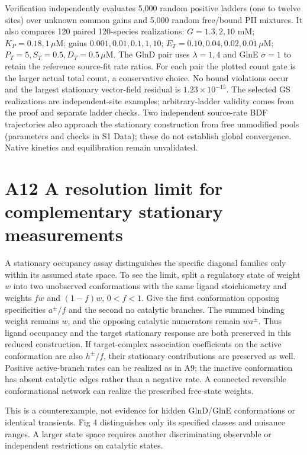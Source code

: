 \documentclass[11pt]{article}
\begin{document}
Verification independently evaluates 5,000 random positive ladders (one to twelve sites) over unknown common gains and 5,000 random free/bound PII mixtures. It also compares 120 paired 120-species realizations: $G=1.3,2,10$ mM; $K_P=0.18,1\,\mu$M; gains $0.001,0.01,0.1,1,10$; $E_T=0.10,0.04,0.02,0.01\,\mu$M; $P_T=5,S_T=0.5,D_T=0.5\,\mu$M. The GlnD pair uses $\lambda=1,4$ and GlnE $\sigma=1$ to retain the reference source-fit rate ratios. For each pair the plotted count gate is the larger actual total count, a conservative choice. No bound violations occur and the largest stationary vector-field residual is $1.23\times10^{-15}$. The selected GS realizations are independent-site examples; arbitrary-ladder validity comes from the proof and separate ladder checks. Two independent source-rate BDF trajectories also approach the stationary construction from free unmodified pools (parameters and checks in S1 Data); these do not establish global convergence. Native kinetics and equilibration remain unvalidated.

\section*{A12 A resolution limit for complementary stationary measurements}

A stationary occupancy assay distinguishes the specific diagonal families only within its assumed state space. To see the limit, split a regulatory state of weight $w$ into two unobserved conformations with the same ligand stoichiometry and weights $fw$ and $(1-f)w$, $0<f<1$. Give the first conformation opposing specificities $a^{\pm}/f$ and the second no catalytic branches. The summed binding weight remains $w$, and the opposing catalytic numerators remain $wa^{\pm}$. Thus ligand occupancy and the target stationary response are both preserved in this reduced construction. If target-complex association coefficients on the active conformation are also $h^{\pm}/f$, their stationary contributions are preserved as well. Positive active-branch rates can be realized as in A9; the inactive conformation has absent catalytic edges rather than a negative rate. A connected reversible conformational network can realize the prescribed free-state weights.

This is a counterexample, not evidence for hidden GlnD/GlnE conformations or identical transients. Fig 4 distinguishes only its specified classes and nuisance ranges. A larger state space requires another discriminating observable or independent restrictions on catalytic states.
\end{document}
